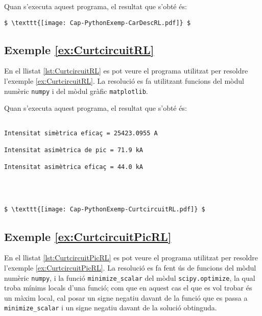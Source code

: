Quan s'executa aquest programa, el resultat que s'obté és:
\lstset{
	language=,
	numbers=none,
	frame=none
}
\begin{lstlisting}[mathescape=true]
$ \texttt{[image: Cap-PythonExemp-CarDescRL.pdf]} $
\end{lstlisting}


\hypertarget{exemple:CurtcircuitRL}{\subsection{Exemple \ref*{ex:CurtcircuitRL} \CurtcircuitRL}}
En el llistat \vref{lst:CurtcircuitRL} es pot veure el programa utilitzat per resoldre l'exemple \vref{ex:CurtcircuitRL}. La resolució es fa utilitzant funcions del mòdul numèric \texttt{numpy} i del mòdul gràfic  \texttt{matplotlib}.

\pagebreak



Quan s'executa aquest programa, el resultat que s'obté és:
\lstset{
	language=,
	numbers=none,
	frame=none
}

\begin{lstlisting}[mathescape=true]
	
Intensitat simètrica eficaç = 25423.0955 A

Intensitat asimètrica de pic = 71.9 kA

Intensitat asimètrica eficaç = 44.0 kA




$ \texttt{[image: Cap-PythonExemp-CurtcircuitRL.pdf]} $
\end{lstlisting}


\hypertarget{exemple:CurtcircuitPicRL}{\subsection{Exemple \ref*{ex:CurtcircuitPicRL} \CurtcircuitPicRL}}
En el llistat \vref{lst:CurtcircuitPicRL} es pot veure el programa utilitzat per resoldre l'exemple \vref{ex:CurtcircuitPicRL}. La resolució es fa fent ús de funcions del mòdul numèric \texttt{numpy}, i la funció \texttt{minimize\_scalar} del mòdul  \texttt{scipy.optimize}, la qual troba mínims locals d'una funció; com que en aquest cas  el que es vol trobar és un màxim local, cal posar un signe negatiu davant de la funció que es passa a \texttt{minimize\_scalar} i un signe negatiu davant de la solució obtinguda.


